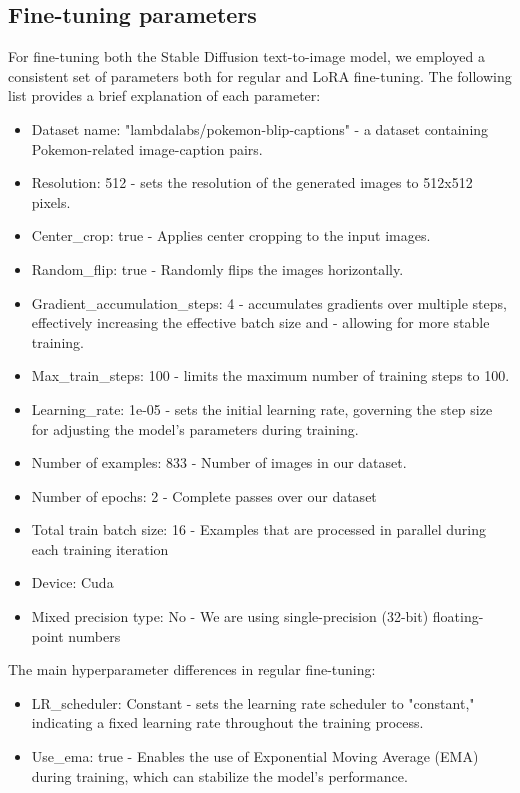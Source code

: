 \documentclass[conference]{IEEEtran}
\begin{document}
\subsection{Fine-tuning parameters}
For fine-tuning both the Stable Diffusion text-to-image model, we employed a consistent set of parameters both for regular and LoRA fine-tuning. The following list provides a brief explanation of each parameter:\begin{itemize}
\item Dataset name: "lambdalabs/pokemon-blip-captions" - a dataset containing Pokemon-related image-caption pairs.
\item Resolution: 512 - sets the resolution of the generated images to 512x512 pixels.
\item Center\_crop: true - Applies center cropping to the input images.
\item Random\_flip: true - Randomly flips the images horizontally.
\item Gradient\_accumulation\_steps: 4 - accumulates gradients over multiple steps, effectively increasing the effective batch size and - allowing for more stable training.
\item Max\_train\_steps: 100 - limits the maximum number of training steps to 100.
\item Learning\_rate: 1e-05 - sets the initial learning rate, governing the step size for adjusting the model's parameters during training.
\item Number of examples: 833 - Number of images in our dataset.
\item Number of epochs: 2 - Complete passes over our dataset
\item Total train batch size: 16 - Examples that are processed in parallel during each training iteration
\item Device: Cuda
\item Mixed precision type: No - We are using single-precision (32-bit) floating-point numbers
\end{itemize}

The main hyperparameter differences in regular fine-tuning:
\begin{itemize}
\item LR\_scheduler: Constant - sets the learning rate scheduler to "constant," indicating a fixed learning rate throughout the training process.
\item Use\_ema: true - Enables the use of Exponential Moving Average (EMA) during training, which can stabilize the model's performance.
\end{itemize}
\end{document}
